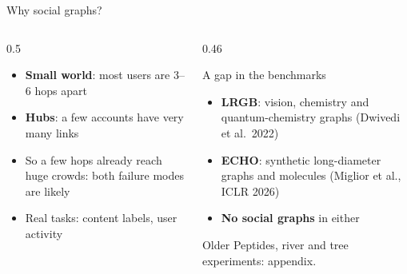 \documentclass[aspectratio=169,10pt]{beamer}
\newcommand{\snote}[1]{{\scriptsize\textcolor{ink!70}{#1}}}
\begin{document}
\begin{frame}{Why social graphs?}
  \begin{columns}[T]
    \begin{column}{0.5\textwidth}
      \begin{itemize}
        \item \textbf{Small world}: most users are 3--6 hops apart
        \item \textbf{Hubs}: a few accounts have very many links
        \item So a few hops already reach huge crowds: both failure modes are likely
        \item Real tasks: content labels, user activity
      \end{itemize}
    \end{column}
    \begin{column}{0.46\textwidth}
      \begin{alertblock}{A gap in the benchmarks}
        \begin{itemize}\small
          \item \textbf{LRGB}: vision, chemistry and quantum-chemistry graphs \snote{(Dwivedi et al.\ 2022)}
          \item \textbf{ECHO}: synthetic long-diameter graphs and molecules \snote{(Miglior et al., ICLR 2026)}
          \item \textbf{No social graphs} in either
        \end{itemize}
      \end{alertblock}
      \snote{Older Peptides, river and tree experiments: appendix.}
    \end{column}
  \end{columns}
\end{frame}
\end{document}
